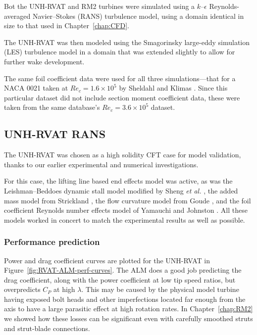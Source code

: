 
Bot the UNH-RVAT and RM2 turbines were simulated using a $k$--$\epsilon$
Reynolds-averaged Navier--Stokes (RANS) turbulence model, using a domain
identical in size to that used in Chapter~\ref{chap:CFD}.

The UNH-RVAT was then modeled using the Smagorinsky large-eddy simulation (LES)
turbulence model \cite{Smagorinsky1963} in a domain that was extended slightly
to allow for further wake development.

The same foil coefficient data were used for all three simulations---that for a
NACA 0021 taken at $Re_c = 1.6 \times 10^5$ by Sheldahl and Klimas
\cite{Sheldahl1981}. Since this particular dataset did not include section
moment coefficient data, these were taken from the same database's $Re_c = 3.6
\times 10^5$ dataset.


\subsection{UNH-RVAT RANS}

The UNH-RVAT was chosen as a high solidity CFT case for model validation, thanks
to our earlier experimental and numerical investigations.

For this case, the lifting line based end effects model was active, as was the
Leishman--Beddoes dynamic stall model modified by Sheng \emph{et al.}
\cite{Sheng2008}, the added mass model from Strickland \cite{Strickland1981},
the flow curvature model from Goude \cite{Goude2012}, and the foil coefficient
Reynolds number effects model of Yamauchi and Johnston \cite{Yamauchi1983}. All
these models worked in concert to match the experimental results as well as
possible.


\subsubsection{Performance prediction}

Power and drag coefficient curves are plotted for the UNH-RVAT in
Figure~\ref{fig:RVAT-ALM-perf-curves}. The ALM does a good job predicting the
drag coefficient, along with the power coefficient at low tip speed ratios, but
overpredicts $C_P$ at high $\lambda$. This may be caused by the physical model
turbine having exposed bolt heads and other imperfections located far enough
from the axis to have a large parasitic effect at high rotation rates. In
Chapter~\ref{chap:RM2} we showed how these losses can be significant even with
carefully smoothed struts and strut-blade connections.

